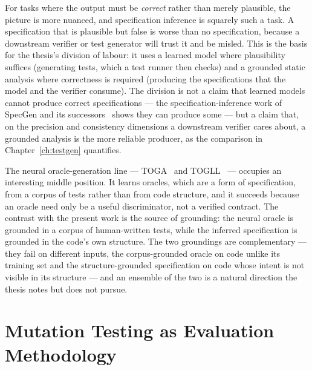 For tasks where the output must be \emph{correct} rather than merely plausible,
the picture is more nuanced, and specification inference is squarely such a task.
A specification that is plausible but false is worse than no specification, because
a downstream verifier or test generator will trust it and be misled. This is the
basis for the thesis's division of labour: it uses a learned model where
plausibility suffices (generating tests, which a test runner then checks) and a
grounded static analysis where correctness is required (producing the
specifications that the model and the verifier consume). The division is not a
claim that learned models cannot produce correct specifications --- the
specification-inference work of SpecGen and its successors~\cite{ma2024specgen,
endres2024can, richter2025beyondpostconditions, teuber2025nextsteps} shows they
can produce some --- but a claim that, on the precision and consistency dimensions
a downstream verifier cares about, a grounded analysis is the more reliable
producer, as the comparison in Chapter~\ref{ch:testgen} quantifies.

The neural oracle-generation line --- TOGA~\cite{dinella2022toga} and
TOGLL~\cite{hossain2024togll} --- occupies an interesting middle position. It
learns oracles, which are a form of specification, from a corpus of tests rather
than from code structure, and it succeeds because an oracle need only be a useful
discriminator, not a verified contract. The contrast with the present work is the
source of grounding: the neural oracle is grounded in a corpus of human-written
tests, while the inferred specification is grounded in the code's own structure.
The two groundings are complementary --- they fail on different inputs, the
corpus-grounded oracle on code unlike its training set and the structure-grounded
specification on code whose intent is not visible in its structure --- and an
ensemble of the two is a natural direction the thesis notes but does not pursue.

\section{Mutation Testing as Evaluation Methodology}
\label{sec:bg-mutation}

